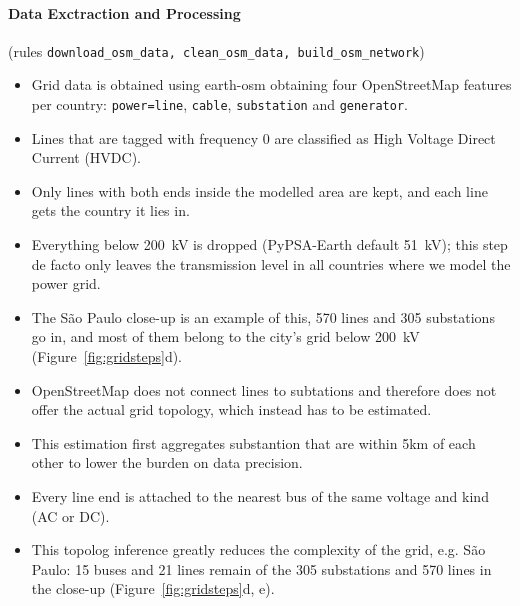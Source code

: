 \paragraph{Data Exctraction and Processing} (rules \texttt{download\_osm\_data, clean\_osm\_data, build\_osm\_network})

\begin{itemize}[nosep,leftmargin=*]
  \item Grid data is obtained using earth-osm \citep{earthosm} obtaining four OpenStreetMap features per country: \texttt{power=line}, \texttt{cable}, \texttt{substation} and \texttt{generator}.
  \item Lines that are tagged with frequency 0 are classified as High Voltage Direct Current (HVDC).
\end{itemize}

\begin{itemize}[nosep,leftmargin=*]
  \item Only lines with both ends inside the modelled area are kept, and each line gets the country it lies in.
  \item Everything below \SI{200}{kV} is dropped (PyPSA-Earth default \SI{51}{kV}); this step de facto only leaves the transmission level in all countries where we model the power grid.
  \item The São Paulo close-up is an example of this, 570 lines and 305 substations go in, and most of them belong to the city's grid below \SI{200}{kV} (Figure~\ref{fig:gridsteps}d).
\end{itemize}

\begin{itemize}[nosep,leftmargin=*]
  \item OpenStreetMap does not connect lines to subtations and therefore does not offer the actual grid topology, which instead has to be estimated.
  \item This estimation first aggregates substantion that are within 5km of each other to lower the burden on data precision.
  \item Every line end is attached to the nearest bus of the same voltage and kind (AC or DC).
  \item This topolog inference greatly reduces the complexity of the grid, e.g. São Paulo: 15 buses and 21 lines remain of the 305 substations and 570 lines in the close-up (Figure~\ref{fig:gridsteps}d, e).
\end{itemize}

